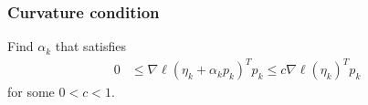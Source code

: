 \documentclass[ 10pt]{beamer}
\begin{document}
%
%
%

\frame
{
  \frametitle{Curvature condition}
%
%
%


Find $\alpha_k$ that satisfies
\begin{align*}
	 0 & \leq \nabla \ell( \eta_k + \alpha_k p_k)^T p_k \leq c \nabla \ell(\eta_k)^T 
p_k
\end{align*}
for some $0 < c < 1$.
\vspace{2mm}

    \scalebox{.28}{}
}

\end{document}
